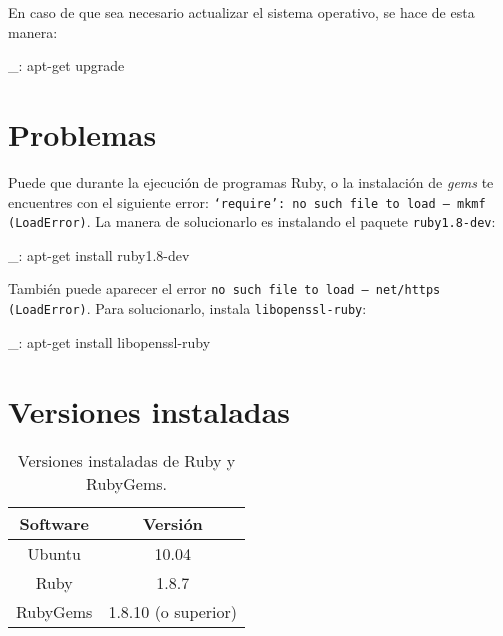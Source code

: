 En caso de que sea necesario actualizar el sistema operativo, se hace de esta manera:

\begin{bashcode}
_: apt-get upgrade
\end{bashcode}


\section{Problemas}

Puede que durante la ejecución de programas Ruby, o la instalación de \emph{gems} te encuentres con el siguiente error: \texttt{`require': no such file to load -- mkmf (LoadError)}. La manera de solucionarlo es instalando el paquete \texttt{ruby1.8-dev}:

\begin{bashcode}
_: apt-get install ruby1.8-dev
\end{bashcode}

También puede aparecer el error \texttt{no such file to load -- net/https (LoadError)}. Para solucionarlo, instala \texttt{libopenssl-ruby}:

\begin{bashcode}
_: apt-get install libopenssl-ruby
\end{bashcode}


\section{Versiones instaladas}

\begin{table}[!htbp]
\centering
   \begin{tabular}{|c|c|}
      \hline
      \textbf{Software} & \textbf{Versión} \\ \hline
      Ubuntu & 10.04 \\ \hline
      Ruby & 1.8.7 \\ \hline
      RubyGems & 1.8.10 (o superior) \\ \hline
   \end{tabular}
\caption{Versiones instaladas de Ruby y RubyGems.}
\label{table:ruby-versions}
\end{table}
